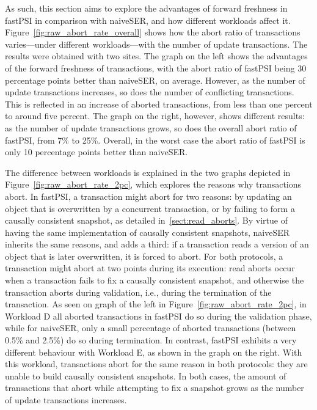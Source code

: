 As such, this section aims to explore the advantages of forward freshness in fastPSI in comparison with naiveSER, and how different workloads affect it. Figure~\ref{fig:raw_abort_rate_overall} shows how the abort ratio of transactions varies---under different workloads---with the number of update transactions. The results were obtained with two sites. The graph on the left shows the advantages of the forward freshness of transactions, with the abort ratio of fastPSI being 30 percentage points better than naiveSER, on average. However, as the number of update transactions increases, so does the number of conflicting transactions. This is reflected in an increase of aborted transactions, from less than one percent to around five percent. The graph on the right, however, shows different results: as the number of update transactions grows, so does the overall abort ratio of fastPSI, from 7\% to 25\%. Overall, in the worst case the abort ratio of fastPSI is only 10 percentage points better than naiveSER.

The difference between workloads is explained in the two graphs depicted in Figure~\ref{fig:raw_abort_rate_2pc}, which explores the reasons why transactions abort. In fastPSI, a transaction might abort for two reasons: by updating an object that is overwritten by a concurrent transaction, or by failing to form a causally consistent snapshot, as detailed in~\ref{sect:read_aborts}. By virtue of having the same implementation of causally consistent snapshots, naiveSER inherits the same reasons, and adds a third: if a transaction reads a version of an object that is later overwritten, it is forced to abort. For both protocols, a transaction might abort at two points during its execution: read aborts occur when a transaction fails to fix a causally consistent snapshot, and otherwise the transaction aborts during validation, i.e., during the termination of the transaction. As seen on graph of the left in Figure~\ref{fig:raw_abort_rate_2pc}, in Workload D all aborted transactions in fastPSI do so during the validation phase, while for naiveSER, only a small percentage of aborted transactions (between 0.5\% and 2.5\%) do so during termination. In contrast, fastPSI exhibits a very different behaviour with Workload E, as shown in the graph on the right. With this workload, transactions abort for the same reason in both protocols: they are unable to build causally consistent snapshots. In both cases, the amount of transactions that abort while attempting to fix a snapshot grows as the number of update transactions increases.

